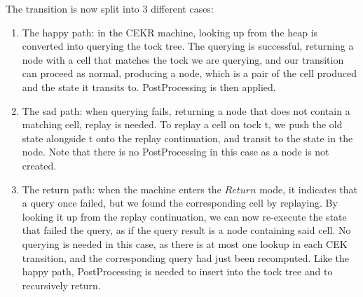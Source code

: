 
The transition is now split into 3 different cases:
\begin{enumerate}
    \item The happy path: in the CEKR machine, looking up from the heap is converted into querying the tock tree. The querying is successful, returning a node with a cell that matches the tock we are querying, and our transition can proceed as normal, producing a node, which is a pair of the cell produced and the state it transits to. PostProcessing is then applied.
    \item The sad path: when querying fails, returning a node that does not contain a matching cell, replay is needed. To replay a cell on tock t, we push the old state alongside t onto the replay continuation, and transit to the state in the node. Note that there is no PostProcessing in this case as a node is not created.
    \item The return path: when the machine enters the $Return$ mode, it indicates that a query once failed, but we found the corresponding cell by replaying. By looking it up from the replay continuation, we can now re-execute the state that failed the query, as if the query result is a node containing said cell. No querying is needed in this case, as there is at most one lookup in each CEK transition, and the corresponding query had just been recomputed. Like the happy path, PostProcessing is needed to insert into the tock tree and to recursively return.
\end{enumerate}

